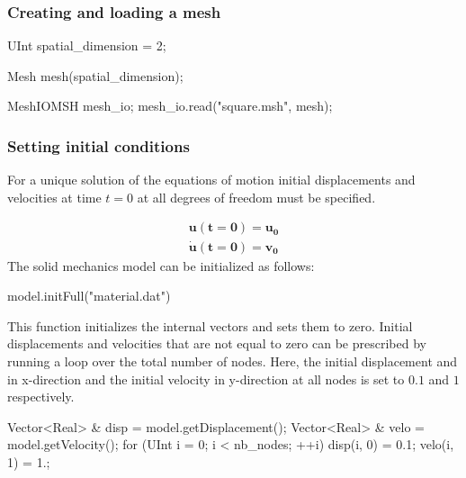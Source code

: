 \documentclass[a4paper,11pt]{book}
\renewcommand{\vec}[1]{\ensuremath{\boldsymbol{#1}}}
\begin{document}
\subsubsection{Creating and loading a mesh\label{sect:common:mesh}}

\begin{cpp}
  UInt spatial_dimension = 2;

  Mesh mesh(spatial_dimension);

  MeshIOMSH mesh_io;
  mesh_io.read("square.msh", mesh);
\end{cpp}

\subsubsection{Setting   initial  conditions  \label{sect:smm:initial_condition}}

For a unique solution of the equations of motion initial displacements and velocities at time $t=0$ at all degrees of freedom must be specified.

\begin{eqnarray}
 \vec{u(t=0)} = \vec{u_{0}}\\
 \vec{\dot u(t=0)} = \vec{v_{0}}
\end{eqnarray}
The solid mechanics model can be initialized as follows:
\begin{cpp}
  model.initFull("material.dat")
\end{cpp}
This function initializes the internal vectors and sets them to zero. Initial displacements and velocities that are not equal to zero can be prescribed by running a loop over the total number of nodes. Here, the initial displacement and in x-direction and the initial velocity in y-direction at all nodes is set to $0.1$ and $1$ respectively.
\begin{cpp}
  Vector<Real> & disp = model.getDisplacement();
  Vector<Real> & velo = model.getVelocity();
  for (UInt i = 0; i < nb_nodes; ++i) {
      disp(i, 0) = 0.1;
      velo(i, 1) = 1.;
  }
\end{cpp}  
\end{document}
